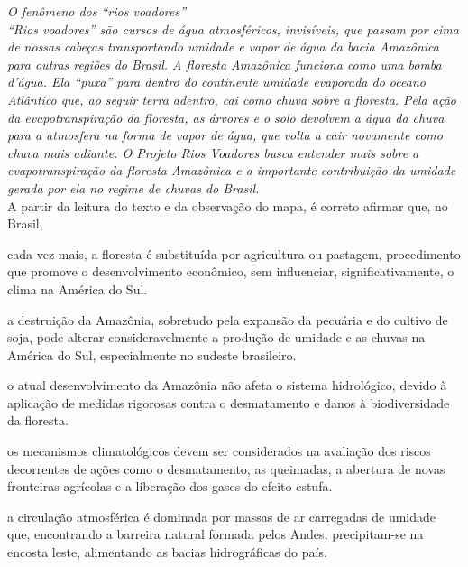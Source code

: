 \questao
{\itshape O fenômeno dos ``rios voadores''\\
``Rios voadores'' são cursos de água atmosféricos, invisíveis, que passam por cima de nossas cabeças transportando umidade e vapor de água da bacia Amazônica para outras regiões do Brasil. A floresta Amazônica funciona como uma bomba d’água. Ela ``puxa'' para dentro do continente umidade evaporada do oceano Atlântico que, ao seguir terra adentro, cai como chuva sobre a floresta. Pela ação da evapotranspiração da floresta, as árvores e o solo devolvem a água da chuva para a atmosfera na forma de vapor de água, que volta a cair novamente como chuva mais adiante. O Projeto Rios Voadores busca entender mais sobre a evapotranspiração da floresta Amazônica e a importante contribuição da umidade gerada por ela no regime de chuvas do Brasil.}\\
A partir da leitura do texto e da observação do mapa, é correto afirmar que, no Brasil,
\begin{alternativas}
\item cada vez mais, a floresta é substituída por agricultura ou pastagem, procedimento que promove o desenvolvimento econômico, sem influenciar, significativamente, o clima na América do Sul.   
\item a destruição da Amazônia, sobretudo pela expansão da pecuária e do cultivo de soja, pode alterar consideravelmente a produção de umidade e as chuvas na América do Sul, especialmente no sudeste brasileiro.
\item o atual desenvolvimento da Amazônia não afeta o sistema hidrológico, devido à aplicação de medidas rigorosas contra o desmatamento e danos à biodiversidade da floresta.   
\item os mecanismos climatológicos devem ser considerados na avaliação dos riscos decorrentes de ações como o desmatamento, as queimadas, a abertura de novas fronteiras agrícolas e a liberação dos gases do efeito estufa.   
\item a circulação atmosférica é dominada por massas de ar carregadas de umidade que, encontrando a barreira natural formada pelos Andes, precipitam-se na encosta leste, alimentando as bacias hidrográficas do país.
\end{alternativas}

